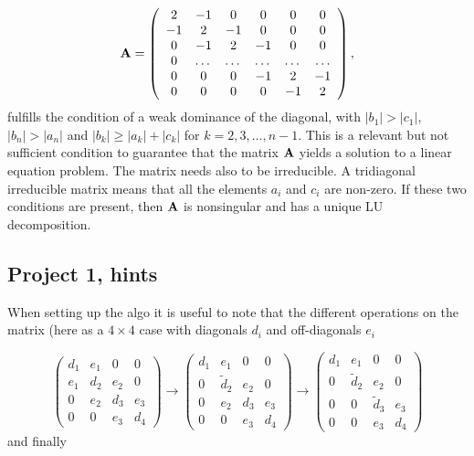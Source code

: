 \documentclass[%
twoside,                 %
final,                   %
10pt]{article}
\begin{document}
{{{{\[
    {\bf A} = \left(\begin{array}{cccccc}
                          2 & -1 & 0 & 0  &0  & 0\\
                          -1 & 2 & -1 &0 &0 &0 \\
                          0 & -1 & 2 & -1 & 0& 0 \\
                          0 & \dots   & \dots & \dots   &\dots & \dots \\
                          0 &0   &0  &-1  &2& -1 \\
                          0 &  0  &0  &0   &-1 & 2 \\
                      \end{array} \right),
\]
fulfills the condition of a weak dominance of the diagonal, with
$|b_1| > |c_1|$, $|b_n| > |a_n|$ and  $|b_k| \ge |a_k|+|c_k|$ for $k=2,3,\dots,n-1$.
This is a relevant but not sufficient condition to guarantee that the matrix ${\bf A}$ yields a solution to a linear
equation problem. The matrix needs also to be irreducible. A tridiagonal irreducible matrix means that all the elements $a_i$ and
$c_i$ are non-zero. If these two conditions are present, then ${\bf A}$ is nonsingular and has a unique LU decomposition.

\subsection{Project 1, hints}

When setting up the algo it is useful to note that the different
operations on the matrix (here as a $4\times 4$ case  with diagonals
$d_i$ and off-diagonals $e_i$

\[
   \left(\begin{array}{cccc}
                          d_1 & e_1 & 0 & 0 \\
                          e_1 & d_2 & e_2 & 0 \\
                          0 & e_2 & d_3 & e_3 \\
                          0 & 0 & e_3 & d_4
                      \end{array} \right)\rightarrow
   \left(\begin{array}{cccc}
                          d_1 & e_1 & 0 & 0 \\
                          0 & \tilde{d}_2 & e_2 & 0 \\
                          0 & e_2 & d_3 & e_3 \\
                          0 & 0 & e_3 & d_4
                      \end{array} \right)\rightarrow
   \left(\begin{array}{cccc}
                          d_1 & e_1 & 0 & 0 \\
                          0 & \tilde{d}_2 & e_2 & 0 \\
                          0 & 0 & \tilde{d}_3 & e_3 \\
                          0 & 0 & e_3 & d_4
                      \end{array} \right)
\]
and finally

}}}}
\end{document}
